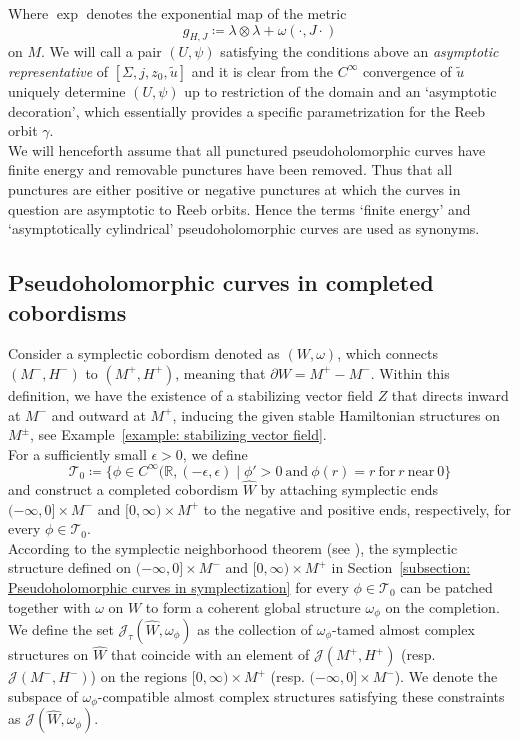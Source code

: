 \documentclass[11pt, a4paper]{amsart}
\newcommand{\cJ}{\mathcal{J}}
\newcommand{\cT}{\mathcal{T}}
\begin{document}
Where $\exp$ denotes the exponential map of the metric $$g_{H,J} \coloneqq \lambda \otimes \lambda + \omega(\cdot, J{\cdot})$$ on $M$. We will call a pair $(U, \psi)$ satisfying the conditions above an \textit{asymptotic representative} of $[\Sigma, j, z_0 , \tilde{u}]$ and it is clear from the $C^{\infty}$ convergence of $\tilde{u}$ uniquely determine $(U, \psi)$ up to restriction of the domain and an `asymptotic decoration', which essentially provides a specific parametrization for the Reeb orbit $\gamma$.\\

We will henceforth assume that all punctured pseudoholomorphic curves have finite energy and removable punctures have been removed.
Thus that all punctures are either positive or negative punctures at which the curves in question are asymptotic to Reeb orbits.
Hence the terms `finite energy' and `asymptotically cylindrical' pseudoholomorphic curves are used as synonyms.

\subsection{Pseudoholomorphic curves in  completed cobordisms}
Consider a symplectic cobordism denoted as $(W, \omega)$, which connects $(M^-, H^-)$ to $(M^+, H^+)$, meaning that $\partial W = M^+ - M^-$. Within this definition, we have the existence of a stabilizing vector field $Z$ that directs inward at $M^-$ and outward at $M^+$, inducing the given stable Hamiltonian structures on $M^{\pm}$, see Example~\ref{example: stabilizing vector field}.\\


For a sufficiently small $\epsilon > 0$, we define  
$$\cT_0 \coloneqq \{ \phi \in C^{\infty}(\mathbb{R}, (-\epsilon,\epsilon) \mid \phi ' >0 \mathrm{\ and\ } \phi(r)=r \mathrm{\ for\ } r \mathrm{\ near\ } 0 \}$$ and construct a completed cobordism $\widehat{W}$ by attaching symplectic ends $(-\infty, 0] \times M^-$ and $[0, \infty) \times M^+$ to the negative and positive ends, respectively, for every $\phi \in \cT_0$.\\

According to the symplectic neighborhood theorem (see \cite[Section~6.2]{SFTwendl}), the symplectic structure defined on $(-\infty, 0] \times M^-$ and $[0, \infty) \times M^+$ in Section~\ref{subsection: Pseudoholomorphic curves in symplectization} for every $\phi \in \cT_0$ can be patched together with $\omega$ on $W$ to form a coherent global structure $\omega_{\phi}$ on the completion. We define the set $\cJ_{\tau}(\widehat{W}, \omega_{\phi})$ as the collection of $\omega_{\phi}$-tamed almost complex structures on $\widehat{W}$ that coincide with an element of $\cJ(M^+,H^+)$ (resp. $\cJ(M^-,H^-)$) on the regions $[0, \infty) \times M^+$ (resp. $(-\infty, 0] \times M^-$). We denote the subspace of $\omega_{\phi}$-compatible almost complex structures satisfying these constraints as $\cJ(\widehat{W},\omega_{\phi})$.\\
\end{document}
